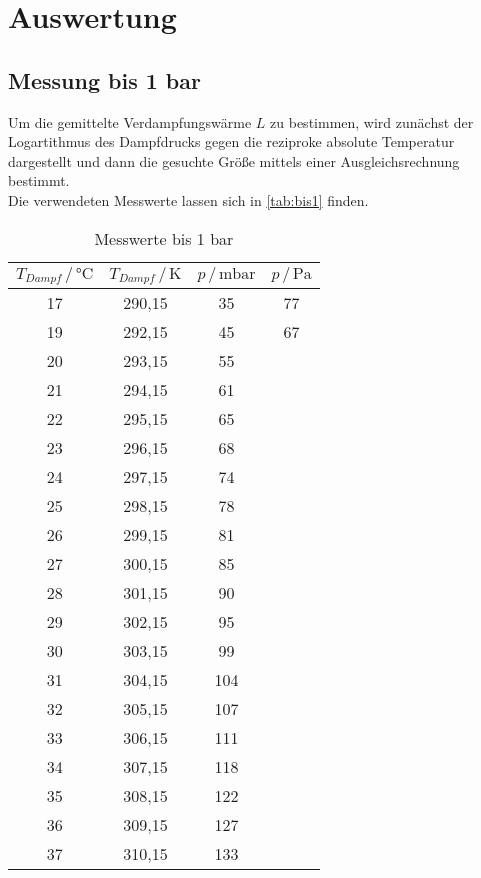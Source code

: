 \section{Auswertung}
\label{sec:Auswertung}

\subsection{Messung bis 1 bar}

Um die gemittelte Verdampfungswärme $L$ zu bestimmen, wird zunächst der
Logartithmus des Dampfdrucks gegen die reziproke absolute Temperatur
dargestellt und dann die gesuchte Größe mittels einer Ausgleichsrechnung
bestimmt.
\\
Die verwendeten Messwerte lassen sich in \autoref{tab:bis1} finden.
\\
\begin{table}
  \centering
  \caption{Messwerte bis 1 \si{\bar}}
  \label{tab:bis1}
  \begin{tabular}{cccc}
  \toprule
  $T_{Dampf} \,/\, \si{\celsius}$ & $T_{Dampf} \,/\, \si{\kelvin}$ & $p \,/\, \si{\milli\bar}$ & $p \,/\, \si{\pascal}$ \\
  \midrule
  17  & 290,15 & 35 & 77   \\
  19  & 292,15 & 45 & 67   \\
  20  & 293,15 & 55 &      \\
  21  & 294,15 & 61 &      \\
  22  & 295,15 & 65 &      \\
  23  & 296,15 & 68 &      \\
  24  & 297,15 & 74 &      \\
  25  & 298,15 & 78 &      \\
  26  & 299,15 & 81 &      \\
  27  & 300,15 & 85 &      \\
  28  & 301,15 & 90 &      \\
  29  & 302,15 & 95 &      \\
  30  & 303,15 & 99 &      \\
  31  & 304,15 & 104 &      \\
  32  & 305,15 & 107 &      \\
  33  & 306,15 & 111 &      \\
  34  & 307,15 & 118 &      \\
  35  & 308,15 & 122 &      \\
  36  & 309,15 & 127 &      \\
  37  & 310,15 & 133 &      \\

\end{tabular}
\end{table}
